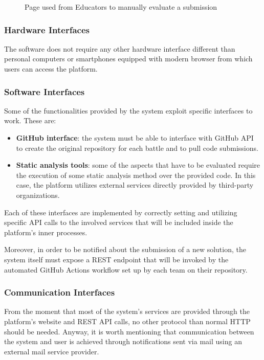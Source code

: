 \begin{enumerate}[label=\textbf{F\arabic*)}]
\begin{figure}[H]
        \caption{Page used from Educators to manually evaluate a submission}
    \end{figure}
\end{enumerate}

\subsubsection{Hardware Interfaces}
The software does not require any other hardware interface different than personal computers or smartphones equipped with modern browser from which users can access the platform.
\subsubsection{Software Interfaces}
Some of the functionalities provided by the system exploit specific interfaces to work. These are:
\begin{itemize}
    \item \textbf{GitHub interface}: the system must be able to interface with GitHub API to create the original repository for each battle and to pull code submissions.
    \item \textbf{Static analysis tools}: some of the aspects that have to be evaluated require the execution of some static analysis method over the provided code. In this case, the platform utilizes external services directly provided by third-party organizations.
\end{itemize}
Each of these interfaces are implemented by correctly setting and utilizing specific API calls to the involved services that will be included inside the platform’s inner processes.

Moreover, in order to be notified about the submission of a new solution, the system itself must expose a REST endpoint that will be invoked by the automated GitHub Actions workflow set up by each team on their repository.
\subsubsection{Communication Interfaces}
From the moment that most of the system’s services are provided through the platform’s website and REST API calls, no other protocol than normal HTTP should be needed. Anyway, it is worth mentioning that communication between the system and user is achieved through notifications sent via mail using an external mail service provider.

